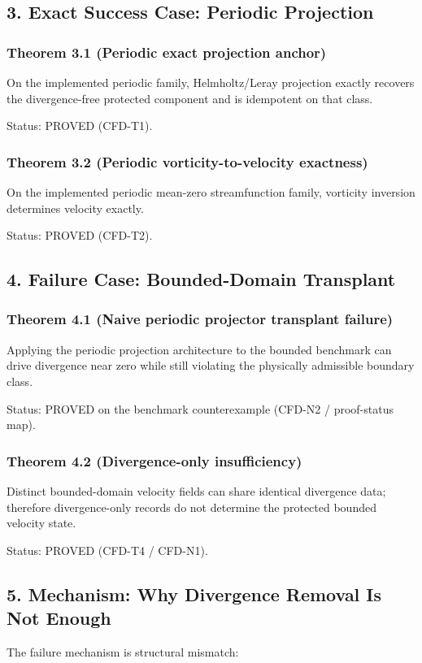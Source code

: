 \documentclass[11pt]{article}
\begin{document}
\subsection*{3. Exact Success Case: Periodic Projection}

\subsubsection*{Theorem 3.1 (Periodic exact projection anchor)}
On the implemented periodic family, Helmholtz/Leray projection exactly recovers the divergence-free protected component and is idempotent on that class.


Status: PROVED (CFD-T1).


\subsubsection*{Theorem 3.2 (Periodic vorticity-to-velocity exactness)}
On the implemented periodic mean-zero streamfunction family, vorticity inversion determines velocity exactly.


Status: PROVED (CFD-T2).


\subsection*{4. Failure Case: Bounded-Domain Transplant}

\subsubsection*{Theorem 4.1 (Naive periodic projector transplant failure)}
Applying the periodic projection architecture to the bounded benchmark can drive divergence near zero while still violating the physically admissible boundary class.


Status: PROVED on the benchmark counterexample (CFD-N2 / proof-status map).


\subsubsection*{Theorem 4.2 (Divergence-only insufficiency)}
Distinct bounded-domain velocity fields can share identical divergence data; therefore divergence-only records do not determine the protected bounded velocity state.


Status: PROVED (CFD-T4 / CFD-N1).


\subsection*{5. Mechanism: Why Divergence Removal Is Not Enough}
The failure mechanism is structural mismatch:
\end{document}
